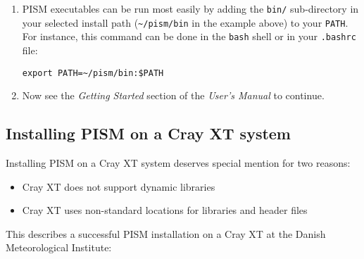 \documentclass[titlepage,letterpaper,final]{scrartcl}
\begin{document}
\begin{enumerate}
If your operating system does not support shared libraries\footnote{This might be necessary if you're building on a Cray XT5 or a Sun Opteron Cluster, for example.}, then set \texttt{Pism_LINK_STATICALLY} to ``ON''. This can be done by
either running
\begin{verbatim}
$  cmake -DPism_LINK_STATICALLY:BOOL=ON ..
\end{verbatim}%
or by using \texttt{ccmake}:\footnote{Install the \texttt{cmake-curses-gui} package to get \texttt{ccmake} on Ubuntu.} run
\begin{verbatim}
$  ccmake ..
\end{verbatim}%
and then change \texttt{Pism_LINK_STATICALLY} (press 'c' (configure), then 'g' (generate makefiles))
before \texttt{make install}.

Object files created during the build process (located in the \texttt{build}
sub-directory) are not automatically deleted after installing PISM, so do ``\texttt{make
  clean}'' if space is an issue. You can also delete the build
directory altogether if you are not planning on re-compiling PISM.

\item PISM executables can be run most easily by adding the \texttt{bin/}
  sub-directory in your selected install path
  (\texttt{\textasciitilde/pism/bin} in the example above) to your
  \texttt{PATH}. For instance, this command can be done in the \texttt{bash}
  shell or in your \texttt{.bashrc} file:
\begin{verbatim}
export PATH=~/pism/bin:$PATH
\end{verbatim}

\item Now see the \emph{Getting Started} section of the \emph{User's Manual} to continue.
\end{enumerate}

\subsection{Installing PISM on a Cray XT system}
\label{sec:cray}

Installing PISM on a Cray XT system deserves special mention for two reasons:
\begin{itemize}
\item Cray XT does not support dynamic libraries
\item Cray XT uses non-standard locations for libraries and header files
\end{itemize}
This describes a successful PISM installation on a Cray XT at the
Danish Meteorological Institute:
\end{document}
